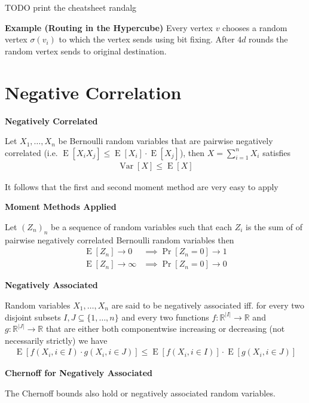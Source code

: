 \documentclass[25pt]{sciposter}
\newcommand{\R}{\mathbb{R}}
\newcommand{\Var}{\operatorname{Var}}
\newcommand{\E}{\operatorname{E}}
\newenvironment{method}[1]{\begin{mdframed}[backgroundcolor=blue!10,innertopmargin=15pt, innerbottommargin=15pt,nobreak=true]
		\textbf{#1 }
	}
	{ 
	\end{mdframed}
}
\newenvironment{thm}[1]{\begin{mdframed}[backgroundcolor=pink!20,innertopmargin=15pt, innerbottommargin=15pt, nobreak=true]
		\textbf{#1 }
	}
	{ 
	\end{mdframed}
}
\newenvironment{defn}[1]{\begin{mdframed}[backgroundcolor=PineGreen!20,innertopmargin=15pt, innerbottommargin=15pt, nobreak=true]
		\textbf{#1 }
	}
	{ 
	\end{mdframed}
}
\begin{document}
\begin{multicols}{3}
		
		TODO print the cheatsheet randalg
		
		
		\textbf{Example (Routing in the Hypercube)} Every vertex $v$ chooses a random vertex $\sigma(v_i)$ to which the vertex sends using bit fixing. After $4d$ rounds the random vertex sends to original destination. 
		
		
		\section{Negative Correlation}
		
		\begin{method}{Negatively Correlated}
			Let $X_1, \ldots, X_n$ be Bernoulli random variables that are pairwise negatively correlated (i.e. $\E[X_i X_j] \leq\E[X_i] \cdot \E[X_j] $), then $X = \sum_{i=1}^{n} X_i$ satisfies
			\begin{align*}
				\Var[X] \leq \E[X]
				\end{align*}
		\end{method}
		It follows that the first and second moment method are very easy to apply
		\begin{thm}{Moment Methods Applied}
Let $(Z_n)_n$ be a sequence of random variables such that each $Z_i$ is the sum of of pairwise negatively correlated Bernoulli random variables then
\begin{align*}
	\E[Z_n] \to 0 &\implies \Pr[Z_n = 0] \to 1\\
	\E[Z_n] \to \infty &\implies \Pr[Z_n = 0] \to 0
\end{align*}
		\end{thm}	
	
	\begin{defn}{Negatively Associated}
	Random variables $X_1, \ldots, X_n$ are said to be negatively associated iff. for every two disjoint subsets $I,J \subseteq \{1,\ldots,n\}$ and every two functions $f:\R^{|I|} \to \R$ and $g:\R^{|J|} \to \R$ that are either both componentwise increasing or decreasing (not necessarily strictly) we have 
	\begin{align*}
		\E[f(X_i, i\in I) \cdot g(X_i, i\in J) ]\leq \E[f(X_i, i\in I)] \cdot \E[g(X_i, i\in J)]
	\end{align*}
	\end{defn}
	
	\begin{method}{Chernoff for Negatively Associated}
		The Chernoff bounds also hold or negatively associated random variables.
	\end{method}


\end{multicols}
\end{document}
